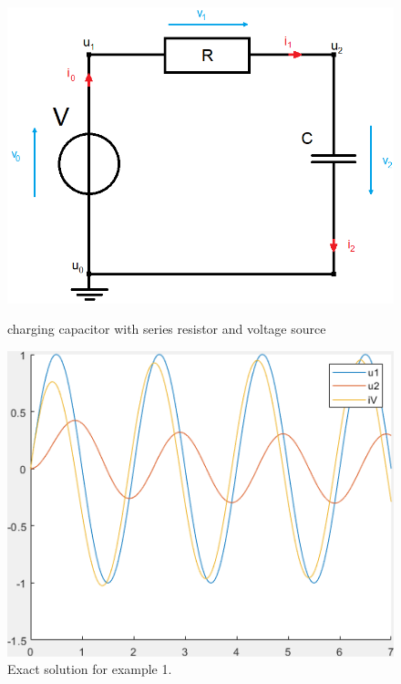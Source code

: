	\begin{frame}
		\begin{figure}[H]
			\centering
			\begin{minipage}{.5\textwidth}
				\centering
				\includegraphics[width=\linewidth]{../Tex/pictures/Example1_simple_p2.png}
				\caption{charging capacitor with series resistor and voltage source}
				\label{fig:charging capacitor}
			\end{minipage}%
			\begin{minipage}{.5\textwidth}
				\centering
				\includegraphics[width=\linewidth]{../Tex/pictures/exact_solution_ex1.png}
				\caption{Exact solution for example 1.}
				\label{fig: Exact solution for example 1}
			\end{minipage}
		\end{figure}
	\end{frame}
	
